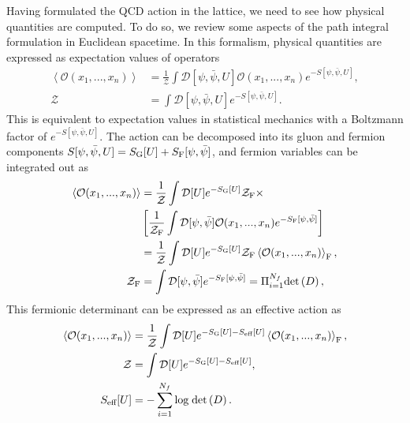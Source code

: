 Having formulated the QCD action in the lattice, we need to see how physical quantities are computed. To do so, we review some aspects of the path integral formulation in Euclidean spacetime. In this formalism, physical quantities are expressed as expectation values of operators
\begin{align}
\left<\mathcal{O}(x_1,...,x_n)\right>&=\frac{1}{\mathcal{Z}}\int\mathcal{D}[\psi,\bar{\psi},U]\mathcal{O}(x_1,...,x_n)e^{-S[\psi,\bar{\psi},U]}, \\
\mathcal{Z}&=\int\mathcal{D}[\psi,\bar{\psi},U]e^{-S[\psi,\bar{\psi},U]}.
\end{align}
This is equivalent to expectation values in statistical mechanics with a Boltzmann factor of $e^{-S[\psi,\bar{\psi},U]}$. The action can be decomposed into its gluon and fermion components $S[\psi,\bar{\psi},U]=S_{\textrm G}[U]+S_{\textrm F}[\psi,\bar{\psi}]$, and fermion variables can be integrated out as
\begin{align}
\left<\mathcal{O}(x_1,...,x_n)\right>&=\frac{1}{\mathcal{Z}}\int\mathcal{D}[U]e^{-S_{\textrm G}[U]}\mathcal{Z}_{\textrm F}\times\\&\left[\frac{1}{\mathcal{Z}_{\textrm F}}\int\mathcal{D}[\psi,\bar{\psi}]\mathcal{O}(x_1,...,x_n)e^{-S_{\textrm F}[\psi,\bar{\psi}]}\right] \\
&=\frac{1}{\mathcal{Z}}\int\mathcal{D}[U]e^{-S_{\textrm G}[U]}\mathcal{Z}_{\textrm F}\left<\mathcal{O}(x_1,...,x_n)\right>_{\textrm F}, \\
\mathcal{Z}_{\textrm F}&=\int\mathcal{D}[\psi,\bar{\psi}]e^{-S_{\textrm F}[\psi,\bar{\psi}]}=\Pi_{i=1}^{N_f}{\textrm{det}}\left(D\right),
\end{align}
This fermionic determinant can be expressed as an effective action as
\begin{align}
\left<\mathcal{O}(x_1,...,x_n)\right>&=\frac{1}{\mathcal{Z}}\int\mathcal{D}[U]e^{-S_{\textrm G}[U]-S_{\textrm{eff}}[U]}\left<\mathcal{O}(x_1,...,x_n)\right>_{\textrm F}, \\
\mathcal{Z}&=\int\mathcal{D}[U]e^{-S_{\textrm G}[U]-S_{\textrm{eff}}[U]}, \\
S_{\textrm{eff}}[U]&=-\sum_{i=1}^{N_f}{\textrm{log}}\;{\textrm{det}}\left(D\right).
\end{align}

